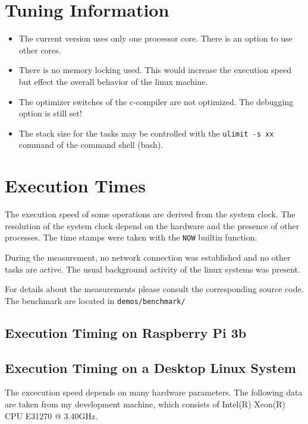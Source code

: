 \documentclass[oneside,10pt]{scrbook}
\begin{document}
\section{Tuning Information}
\begin{itemize}
\item The current version uses only one processor core.
     There is an option to use other cores.  
\item There is no memory locking used.
     This would increase the execution speed but effect the overall
     behavior of the linux machine.
\item The optimizer switches of the c-compiler are not optimized.
   The debugging option is still set!
\item The stack size for the tasks may be controlled with the
   \texttt{ulimit -s xx} command of the command shell (bash).
\end{itemize}

\iffalse
\section{Execution Times}
The execution speed of some operations are derived from the system clock.
The resolution of the system clock depend on the hardware and the 
presence of other processes.
The time stamps were taken with the \texttt{NOW} builtin function.

During the measurement, no network connection was established and no
other tasks are active. The usual background activity of the linux
systems was present.

For details about the measurements please consult the corresponding
source code. The benchmark are located in \verb|demos/benchmark/|

\subsection{Execution Timing on Raspberry Pi 3b}

\subsection{Execution Timing on a Desktop Linux System}
The excecution speed depends on many hardware parameters. 
The following data are taken from my development machine, which consists of
Intel(R) Xeon(R) CPU E31270 @ 3.40GHz.
\end{document}

